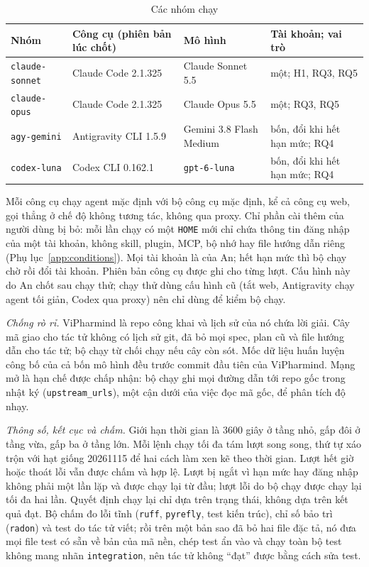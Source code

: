\begin{table}[H]
\centering\small
\caption{Các nhóm chạy}\label{tab:cohorts}
\begin{tabularx}{\linewidth}{@{}lllX@{}}
\toprule
Nhóm & Công cụ (phiên bản lúc chốt) & Mô hình & Tài khoản; vai trò \\
\midrule
\texttt{claude-sonnet} & Claude Code 2.1.325 & Claude Sonnet 5.5 & một; H1, RQ3, RQ5 \\
\texttt{claude-opus} & Claude Code 2.1.325 & Claude Opus 5.5 & một; RQ3, RQ5 \\
\texttt{agy-gemini} & Antigravity CLI 1.5.9 & Gemini 3.8 Flash Medium & bốn, đổi khi hết hạn mức; RQ4 \\
\texttt{codex-luna} & Codex CLI 0.162.1 & \texttt{gpt-6-luna} & bốn, đổi khi hết hạn mức; RQ4 \\
\bottomrule
\end{tabularx}
\end{table}

Mỗi công cụ chạy agent mặc định với bộ công cụ mặc định, kể cả công cụ web, gọi thẳng ở chế độ không tương
tác, không qua proxy. Chỉ phần cài thêm của người dùng bị bỏ: mỗi lần chạy có một \texttt{HOME} mới chỉ chứa
thông tin đăng nhập của một tài khoản, không skill, plugin, MCP, bộ nhớ hay file hướng dẫn riêng
(Phụ lục~\ref{app:conditions}). Mọi tài khoản là của An; hết hạn mức thì bộ chạy chờ rồi đổi tài khoản.
Phiên bản công cụ được ghi cho từng lượt. Cấu hình này do An chốt sau chạy thử; chạy thử dùng cấu hình cũ
(tắt web, Antigravity chạy agent tối giản, Codex qua proxy) nên chỉ dùng để kiểm bộ chạy.

\textit{Chống rò rỉ.} ViPharmind là repo công khai và lịch sử của nó chứa lời giải. Cây mã giao cho tác tử
không có lịch sử git, đã bỏ mọi spec, plan cũ và file hướng dẫn cho tác tử; bộ chạy từ chối chạy nếu cây còn
sót. Mốc dữ liệu huấn luyện công bố của cả bốn mô hình đều trước commit đầu tiên của ViPharmind. Mạng mở là
hạn chế được chấp nhận: bộ chạy ghi mọi đường dẫn tới repo gốc trong nhật ký (\texttt{upstream\_urls}), một
cận dưới của việc đọc mã gốc, để phân tích độ nhạy.

\textit{Thông số, kết cục và chấm.} Giới hạn thời gian là 3600 giây ở tầng nhỏ, gấp đôi ở tầng vừa, gấp ba
ở tầng lớn. Mỗi lệnh chạy tối đa tám lượt song song, thứ tự xáo trộn với hạt giống 20261115 để hai cách làm
xen kẽ theo thời gian. Lượt hết giờ hoặc thoát lỗi vẫn được chấm và hợp lệ. Lượt bị ngắt vì hạn mức hay
đăng nhập không phải một lần lặp và được chạy lại từ đầu; lượt lỗi do bộ chạy được chạy lại tối đa hai lần.
Quyết định chạy lại chỉ dựa trên trạng thái, không dựa trên kết quả đạt. Bộ chấm đo lỗi tĩnh (\texttt{ruff},
\texttt{pyrefly}, test kiến trúc), chỉ số bảo trì (\texttt{radon}) và test do tác tử viết; rồi trên một bản
sao đã bỏ hai file đặc tả, nó đưa mọi file test có sẵn về bản của mã nền, chép test ẩn vào và chạy toàn bộ
test không mang nhãn \texttt{integration}, nên tác tử không ``đạt'' được bằng cách sửa test.

